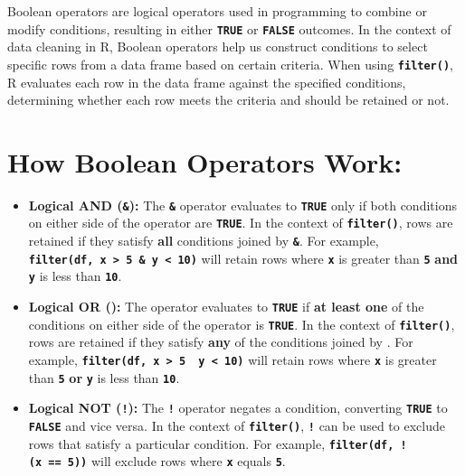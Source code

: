 \documentclass[
]{book}
\begin{document}
Boolean operators are logical operators used in programming to combine or modify conditions, resulting in either \textbf{\texttt{TRUE}} or \textbf{\texttt{FALSE}} outcomes. In the context of data cleaning in R, Boolean operators help us construct conditions to select specific rows from a data frame based on certain criteria. When using \textbf{\texttt{filter()}}, R evaluates each row in the data frame against the specified conditions, determining whether each row meets the criteria and should be retained or not.

\hypertarget{how-boolean-operators-work}{%
\section{How Boolean Operators Work:}\label{how-boolean-operators-work}}

\begin{itemize}
\item
  \textbf{Logical AND (\texttt{\&}):} The \textbf{\texttt{\&}} operator evaluates to \textbf{\texttt{TRUE}} only if both conditions on either side of the operator are \textbf{\texttt{TRUE}}. In the context of \textbf{\texttt{filter()}}, rows are retained if they satisfy \textbf{all} conditions joined by \textbf{\texttt{\&}}. For example, \textbf{\texttt{filter(df,\ x\ \textgreater{}\ 5\ \&\ y\ \textless{}\ 10)}} will retain rows where \textbf{\texttt{x}} is greater than \textbf{\texttt{5}} \textbf{and} \textbf{\texttt{y}} is less than \textbf{\texttt{10}}.
\item
  \textbf{Logical OR (\texttt{\textbar{}}):} The \textbf{\texttt{\textbar{}}} operator evaluates to \textbf{\texttt{TRUE}} if \textbf{at least one} of the conditions on either side of the operator is \textbf{\texttt{TRUE}}. In the context of \textbf{\texttt{filter()}}, rows are retained if they satisfy \textbf{any} of the conditions joined by \textbf{\texttt{\textbar{}}}. For example, \textbf{\texttt{filter(df,\ x\ \textgreater{}\ 5\ \textbar{}\ y\ \textless{}\ 10)}} will retain rows where \textbf{\texttt{x}} is greater than \textbf{\texttt{5}} \textbf{or} \textbf{\texttt{y}} is less than \textbf{\texttt{10}}.
\item
  \textbf{Logical NOT (\texttt{!}):} The \textbf{\texttt{!}} operator negates a condition, converting \textbf{\texttt{TRUE}} to \textbf{\texttt{FALSE}} and vice versa. In the context of \textbf{\texttt{filter()}}, \textbf{\texttt{!}} can be used to exclude rows that satisfy a particular condition. For example, \textbf{\texttt{filter(df,\ !(x\ ==\ 5))}} will exclude rows where \textbf{\texttt{x}} equals \textbf{\texttt{5}}.
\end{itemize}
\end{document}
